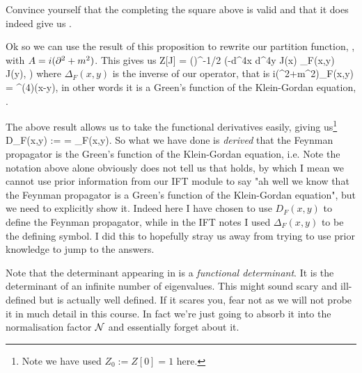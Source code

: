\bbox 
    Convince yourself that the completing the square above is valid and that it does indeed give us . 
\ebox 

Ok so we can use the result of this proposition to rewrite our partition function, , with $A=i(\partial^2+m^2)$. This gives us 
\be 
\label{eqn:PartitionDetKG}
    Z[J] = \det()^{-1/2} \cN \exp\bigg(-\int d^4x d^4y J(x) \Delta_F(x,y) J(y), \bigg) 
\ee 
where $\Delta_F(x,y)$ is the inverse of our operator, that is 
\bse 
    i(\p^2+m^2)\Delta_F(x,y) = \del^{(4)}(x-y),
\ese 
in other words it is a Green's function of the Klein-Gordan equation, . 

The above result allows us to take the functional derivatives easily, giving us\footnote{Note we have used $Z_0:=Z[0]=1$ here.}
\bse 
    D_F(x,y) :=  = \Delta_F(x,y). 
\ese 
So what we have done is \textit{derived} that the Feynman propagator is the Green's function of the Klein-Gordan equation, i.e. 
\br 
    Note the notation above alone obviously does not tell us that  holds, by which I mean we cannot use prior information from our IFT module to say "ah well we know that the Feynman propagator is a Green's function of the Klein-Gordan equation", but we need to explicitly show it. Indeed here I have chosen to use $D_F(x,y)$ to define the Feynman propagator, while in the IFT notes I used $\Delta_F(x,y)$ to be the defining symbol. I did this to hopefully stray us away from trying to use prior knowledge to jump to the answers. 
\er 

\br 
    Note that the determinant appearing in  is a \textit{functional determinant}. It is the determinant of an infinite number of eigenvalues. This might sound scary and ill-defined but is actually well defined. If it scares you, fear not as we will not probe it in much detail in this course. In fact we're just going to absorb it into the normalisation factor $\mathcal{N}$ and essentially forget about it. 
\er 

